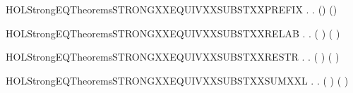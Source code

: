 \newcommand{\HOLStrongEQTheoremsSTRONGXXEQUIVXXSUBSTXXPARXXR}{\UseVerbatim{HOLStrongEQTheoremsSTRONGXXEQUIVXXSUBSTXXPARXXR}}
\begin{SaveVerbatim}{HOLStrongEQTheoremsSTRONGXXEQUIVXXSUBSTXXPREFIX}
\HOLTokenTurnstile{} \HOLSymConst{\HOLTokenForall{}} .    \HOLSymConst{\HOLTokenImp{}} \HOLSymConst{\HOLTokenForall{}}.  () ()
\end{SaveVerbatim}
\newcommand{\HOLStrongEQTheoremsSTRONGXXEQUIVXXSUBSTXXPREFIX}{\UseVerbatim{HOLStrongEQTheoremsSTRONGXXEQUIVXXSUBSTXXPREFIX}}
\begin{SaveVerbatim}{HOLStrongEQTheoremsSTRONGXXEQUIVXXSUBSTXXRELAB}
\HOLTokenTurnstile{} \HOLSymConst{\HOLTokenForall{}} .
          \HOLSymConst{\HOLTokenImp{}}
       \HOLSymConst{\HOLTokenForall{}}.  (  ) (  )
\end{SaveVerbatim}
\newcommand{\HOLStrongEQTheoremsSTRONGXXEQUIVXXSUBSTXXRELAB}{\UseVerbatim{HOLStrongEQTheoremsSTRONGXXEQUIVXXSUBSTXXRELAB}}
\begin{SaveVerbatim}{HOLStrongEQTheoremsSTRONGXXEQUIVXXSUBSTXXRESTR}
\HOLTokenTurnstile{} \HOLSymConst{\HOLTokenForall{}} .    \HOLSymConst{\HOLTokenImp{}} \HOLSymConst{\HOLTokenForall{}}.  (\HOLConst{\ensuremath{\nu}}  ) (\HOLConst{\ensuremath{\nu}}  )
\end{SaveVerbatim}
\newcommand{\HOLStrongEQTheoremsSTRONGXXEQUIVXXSUBSTXXRESTR}{\UseVerbatim{HOLStrongEQTheoremsSTRONGXXEQUIVXXSUBSTXXRESTR}}
\begin{SaveVerbatim}{HOLStrongEQTheoremsSTRONGXXEQUIVXXSUBSTXXSUMXXL}
\HOLTokenTurnstile{} \HOLSymConst{\HOLTokenForall{}} .
          \HOLSymConst{\HOLTokenImp{}}
       \HOLSymConst{\HOLTokenForall{}}.  ( \HOLSymConst{\ensuremath{+}} ) ( \HOLSymConst{\ensuremath{+}} )
\end{SaveVerbatim}
